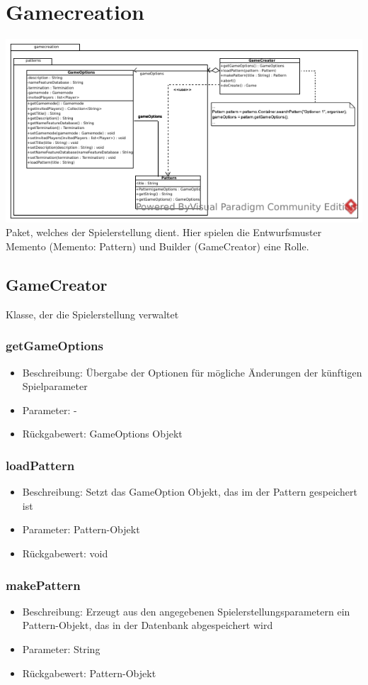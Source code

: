 \documentclass[a4paper]{scrreprt}
\begin{document}
    \section{Gamecreation}
    \includegraphics[width=\textwidth]{img/package/gamecreation.pdf}
    Paket, welches der Spielerstellung dient. Hier spielen die Entwurfsmuster Memento (Memento: Pattern) und Builder (GameCreator) eine Rolle.
    \subsection{GameCreator}
    Klasse, der die Spielerstellung verwaltet
    \subsubsection{getGameOptions}
    \begin{itemize}
        \item Beschreibung: Übergabe der Optionen für mögliche Änderungen der künftigen Spielparameter
        \item Parameter: -
        \item Rückgabewert: GameOptions Objekt
    \end{itemize}
    \subsubsection{loadPattern}
    \begin{itemize}
        \item Beschreibung: Setzt das GameOption Objekt, das im der Pattern gespeichert ist
        \item Parameter: Pattern-Objekt
        \item Rückgabewert: void
    \end{itemize}
    \subsubsection{makePattern}
    \begin{itemize}
        \item Beschreibung: Erzeugt aus den angegebenen Spielerstellungsparametern ein Pattern-Objekt, das in der Datenbank abgespeichert wird
        \item Parameter: String
        \item Rückgabewert: Pattern-Objekt
    \end{itemize}
\end{document}
